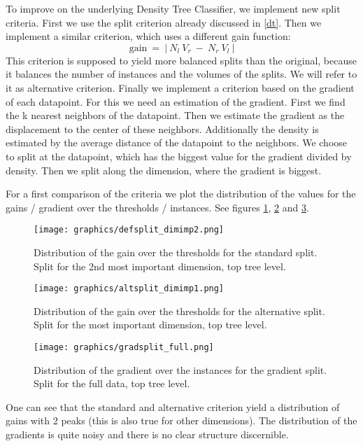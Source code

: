 \documentclass{article}
\begin{document}
To improve on the underlying Density Tree Classifier, we implement new split criteria.
First we use the split criterion already discussed in \ref{dt}. 
Then we implement a similar criterion, which uses a different gain function:
\begin{equation}
	\textrm{gain} ~  = ~ | ~ N_l ~ V_r ~ - ~ N_r ~ V_l ~ |
\end{equation}
This criterion is supposed to yield more balanced splits than the original, because it balances the 
number of instances and the volumes of the splits. We will refer to it as alternative criterion.
\newline
Finally we implement a criterion based on the gradient of each datapoint.
For this we need an estimation of the gradient. First we find the k nearest neighbors of
the datapoint. Then we estimate the gradient as the displacement to the center of these neighbors.
Additionally the density is estimated by the average distance of the datapoint to the neighbors.
We choose to split at the datapoint, which has the biggest value for the gradient divided by density.
Then we split along the dimension, where the gradient is biggest.

For a first comparison of the criteria we plot the distribution of the values for the gains / gradient
over the thresholds / instances. See figures \ref{fig2a}, \ref{fig2b} and \ref{fig2c}.

\begin{figure}[h]
	\centering
	\texttt{[image: graphics/defsplit\_dimimp2.png]}
	\caption{Distribution of the gain over the thresholds for the standard split.
	Split for the 2nd most important dimension, top tree level.}
	\label{fig2a}
\end{figure}

\begin{figure}[h]
	\centering
	\texttt{[image: graphics/altsplit\_dimimp1.png]}
	\caption{Distribution of the gain over the thresholds for the alternative split.
	Split for the most important dimension, top tree level.}
	\label{fig2b}
\end{figure}

\begin{figure}[h]
	\centering
	\texttt{[image: graphics/gradsplit\_full.png]}
	\caption{Distribution of the gradient over the instances for the gradient split.
	Split for the full data, top tree level.}
	\label{fig2c}
\end{figure}

One can see that the standard and alternative criterion yield a distribution  
of gains with 2 peaks (this is also true for other dimensions).
The distribution of the gradients is quite noisy and there is no clear structure discernible.
\end{document}

